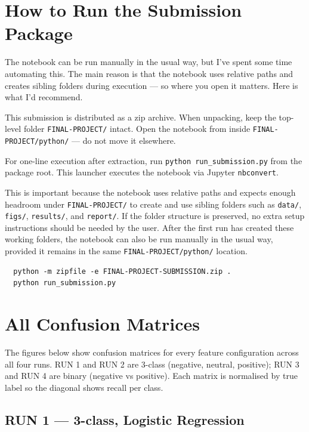 \documentclass[12pt]{article}
\begin{document}
\nocite{*}





\appendix

\section{How to Run the Submission Package}

The notebook can be run manually in the usual way, but I've spent some time automating this.
The main reason is that the notebook uses relative paths and creates sibling folders during execution --- so where you open it matters.
Here is what I'd recommend.

This submission is distributed as a zip archive.
When unpacking, keep the top-level folder \texttt{FINAL-PROJECT/} intact.
Open the notebook from inside \texttt{FINAL-PROJECT/python/} --- do not move it elsewhere.

For one-line execution after extraction, run \texttt{python run\_submission.py} from the package root.
This launcher executes the notebook via Jupyter \texttt{nbconvert}.

This is important because the notebook uses relative paths and expects enough headroom under \texttt{FINAL-PROJECT/} to create and use sibling folders such as \texttt{data/}, \texttt{figs/}, \texttt{results/}, and \texttt{report/}.
If the folder structure is preserved, no extra setup instructions should be needed by the user.
After the first run has created these working folders, the notebook can also be run manually in the usual way, provided it remains in the same \texttt{FINAL-PROJECT/python/} location.

\begin{verbatim}
  python -m zipfile -e FINAL-PROJECT-SUBMISSION.zip .
  python run_submission.py
\end{verbatim}

\section{All Confusion Matrices}

The figures below show confusion matrices for every feature configuration across all four runs.
RUN 1 and RUN 2 are 3-class (negative, neutral, positive); RUN 3 and RUN 4 are binary (negative vs positive).
Each matrix is normalised by true label so the diagonal shows recall per class.

\subsection*{RUN 1 --- 3-class, Logistic Regression}
\end{document}
